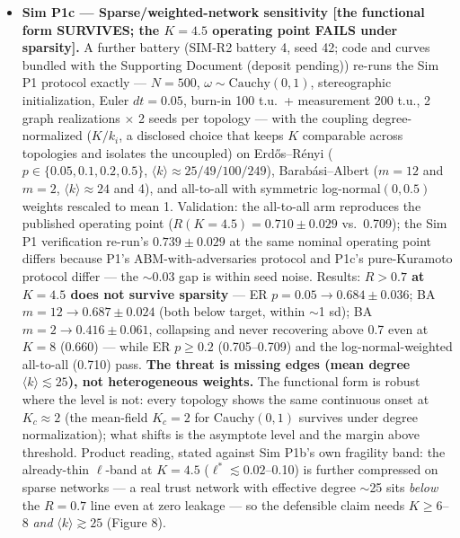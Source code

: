 \documentclass[
]{article}
\begin{document}
\begin{itemize}
  \textbf{Definitional component:} component (i) of the leakage
  operationalization (\(K_{\mathrm{eff}} = K(1-\ell)\)) makes part of
  the R-decay definitional --- Kuramoto coherence decreases
  monotonically in coupling by construction; the non-definitional
  content is component (ii) (observation noise) and the joint surface's
  quantitative thresholds. The identification of expropriative
  observation with channel attenuation is a modeling assumption, not a
  derivation; the \(\psi\)-model (companion theory preprint, §3.3) is
  the stack's mechanistic account of chilling.
\item
  \textbf{Sim P1c --- Sparse/weighted-network sensitivity {[}the
  functional form SURVIVES; the \(K = 4.5\) operating point FAILS under
  sparsity{]}.} A further battery (SIM-R2 battery 4, seed 42; code and
  curves bundled with the Supporting Document (deposit pending)) re-runs
  the Sim P1 protocol exactly --- \(N = 500\), \(\omega \sim
    \mathrm{Cauchy}(0,1)\), stereographic initialization, Euler
  \(dt = 0.05\), burn-in 100 t.u.~+ measurement 200 t.u., 2 graph
  realizations \(\times\) 2 seeds per topology --- with the coupling
  degree-normalized (\(K/k_i\), a disclosed choice that keeps \(K\)
  comparable across topologies and isolates the uncoupled) on
  Erdős--Rényi (\(p \in \{0.05, 0.1, 0.2, 0.5\}\),
  \(\langle k\rangle \approx 25/49/100/249\)), Barabási--Albert
  (\(m = 12\) and \(m = 2\), \(\langle k\rangle \approx 24\) and 4), and
  all-to-all with symmetric log-normal\((0, 0.5)\) weights rescaled to
  mean 1. Validation: the all-to-all arm reproduces the published
  operating point (\(R(K = 4.5) = 0.710 \pm 0.029\) vs.~0.709); the Sim
  P1 verification re-run's \(0.739 \pm 0.029\) at the same nominal
  operating point differs because P1's ABM-with-adversaries protocol and
  P1c's pure-Kuramoto protocol differ --- the \(\sim\)0.03 gap is within
  seed noise. Results: \textbf{\(R > 0.7\) at \(K = 4.5\) does not
  survive sparsity} --- ER \(p = 0.05 \to 0.684 \pm 0.036\); BA
  \(m = 12 \to 0.687 \pm 0.024\) (both below target, within \(\sim\)1
  sd); BA \(m = 2 \to 0.416 \pm 0.061\), collapsing and never recovering
  above 0.7 even at \(K = 8\) (0.660) --- while ER \(p \geq 0.2\)
  (0.705--0.709) and the log-normal-weighted all-to-all (0.710) pass.
  \textbf{The threat is missing edges (mean degree
  \(\langle k\rangle \lesssim 25\)), not heterogeneous weights.} The
  functional form is robust where the level is not: every topology shows
  the same continuous onset at \(K_c \approx 2\) (the mean-field
  \(K_c = 2\) for Cauchy\((0,1)\) survives under degree normalization);
  what shifts is the asymptote level and the margin above threshold.
  Product reading, stated against Sim P1b's own fragility band: the
  already-thin \(\ell\)-band at \(K = 4.5\)
  (\(\ell^{*} \lesssim 0.02\)--0.10) is further compressed on sparse
  networks --- a real trust network with effective degree \(\sim\)25
  sits \emph{below} the \(R = 0.7\) line even at zero leakage --- so the
  defensible claim needs \(K \geq 6\)--8 \emph{and}
  \(\langle k\rangle \gtrsim 25\) (Figure 8).


\end{itemize}
\end{document}
